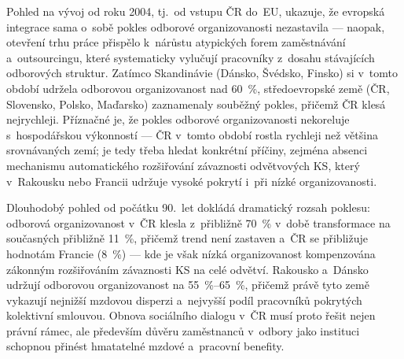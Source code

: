 Pohled na vývoj od roku 2004, tj.\ od vstupu ČR do~\ac{EU}, ukazuje, že evropská integrace sama o~sobě pokles odborové organizovanosti nezastavila --- naopak, otevření trhu práce přispělo k~nárůstu atypických forem zaměstnávání a~outsourcingu, které systematicky vylučují pracovníky z~dosahu stávajících odborových struktur.
Zatímco Skandinávie (Dánsko, Švédsko, Finsko) si v~tomto období udržela odborovou organizovanost nad \SI{60}{\percent}, středoevropské země (\ac{ČR}, Slovensko, Polsko, Maďarsko) zaznamenaly souběžný pokles, přičemž \ac{ČR} klesá nejrychleji.
Příznačné je, že pokles odborové organizovanosti nekoreluje s~hospodářskou výkonností --- \ac{ČR} v~tomto období rostla rychleji než většina srovnávaných zemí; je tedy třeba hledat konkrétní příčiny, zejména absenci mechanismu automatického rozšiřování závaznosti odvětvových \ac{KS}, který v~Rakousku nebo Francii udržuje vysoké pokrytí i~při nízké organizovanosti.



Dlouhodobý pohled od počátku 90.~let dokládá dramatický rozsah poklesu: odborová organizovanost v~ČR klesla z~přibližně \SI{70}{\percent} v~době transformace na současných přibližně \SI{11}{\percent}, přičemž trend není zastaven a~ČR se přibližuje hodnotám Francie (\SI{8}{\percent}) --- kde je však nízká organizovanost kompenzována zákonným rozšiřováním závaznosti \ac{KS} na celé odvětví.
Rakousko a~Dánsko udržují odborovou organizovanost na \SIrange{55}{65}{\percent}, přičemž právě tyto země vykazují nejnižší mzdovou disperzi a~nejvyšší podíl pracovníků pokrytých kolektivní smlouvou.
Obnova sociálního dialogu v~ČR musí proto řešit nejen právní rámec, ale především důvěru zaměstnanců v~odbory jako instituci schopnou přinést hmatatelné mzdové a~pracovní benefity.
